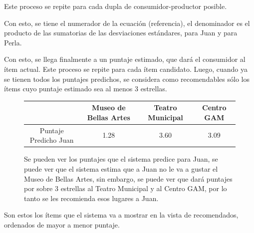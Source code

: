 Este proceso se repite para cada dupla de consumidor-productor posible.

Con esto, se tiene el numerador de la ecuación (referencia), el denominador es el producto de las sumatorias de las desviaciones estándares, para Juan y para Perla.

Con esto, se llega finalmente a un puntaje estimado, que dará el consumidor al ítem actual. Este proceso se repite para cada ítem candidato.
Luego, cuando ya se tienen todos los puntajes predichos, se considera como recomendables sólo los ítems cuyo puntaje estimado sea al menos 3 estrellas.


\begin{figure}
\centering
\begin{adjustbox}{max width=\textwidth}
\begin{tabular}{|c|c|c|c|}
\hline
                &   Museo de Bellas Artes & Teatro Municipal & Centro GAM \\

\hline
Puntaje Predicho Juan          & 1.28  &  3.60  & 3.09  \\
\hline


\end{tabular}
\end{adjustbox}
\caption{Se pueden ver los puntajes que el sistema predice para Juan, se puede ver que el sistema estima que a Juan no le va a gustar el Museo de Bellas Artes, sin embargo, se puede ver que dará puntajes por sobre 3 estrellas al Teatro Municipal y al Centro GAM, por lo tanto se les recomienda esos lugares a Juan.}

\end{figure}


Son estos los ítems que el sistema va a mostrar en la vista de recomendados, ordenados de mayor a menor puntaje. 





